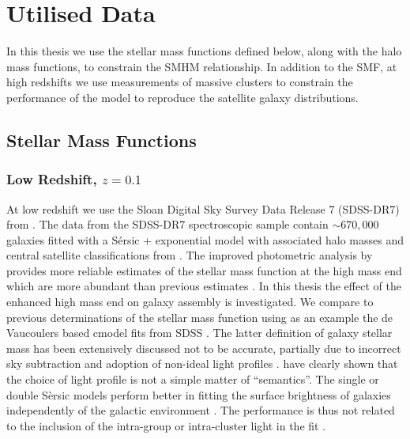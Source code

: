 \section{Utilised Data}

In this thesis we use the stellar mass functions defined below, along with the halo mass functions, to constrain the SMHM relationship. In addition to the SMF, at high redshifts we use measurements of massive clusters to constrain the performance of the model to reproduce the satellite galaxy distributions.

\subsection{Stellar Mass Functions}
\label{subsec:SMF}

\subsubsection{Low Redshift, $z = 0.1$}
\label{subsub:SDSS}
At low redshift we use the Sloan Digital Sky Survey Data Release 7 (SDSS-DR7) from \citet{Meert2015ASystematics}.
The data from the SDSS-DR7 spectroscopic sample \citep{Abazajian2009THESURVEY} contain $\sim 670,000$ galaxies fitted with a S\'ersic + exponential model \citep[PyMorph;][]{Meert2015ASystematics} with associated halo masses and central satellite classifications from \citep{Yang2012EvolutionHalos}. The improved photometric analysis by \citet{Meert2015ASystematics} provides more reliable estimates of the stellar mass function at the high mass end which are more abundant than previous estimates \citep{Bernardi2016TheEvolution, Bernardi2017ComparingLight}.
In this thesis the effect of the enhanced high mass end on galaxy assembly is investigated. We compare to previous determinations of the stellar mass function using as an example the de Vaucoulers \citep{deVaucouleurs1948RecherchesExtragalactiques} based cmodel fits from SDSS \citep{Abazajian2009THESURVEY}. The latter definition of galaxy stellar mass has been extensively discussed not to be accurate, partially due to incorrect sky subtraction and adoption of non-ideal light profiles \citep{Bernardi2013TheProfile}. \citet{Bernardi2017ComparingLight} have clearly shown that the choice of light profile is not a simple matter of ``semantics''. The single or double S\`ersic models perform better in fitting the surface brightness of galaxies independently of the galactic environment \citep{Meert2015ASystematics}. The performance is thus not related to the inclusion of the intra-group or intra-cluster light in the fit \citep{Bernardi2017ComparingLight}.

